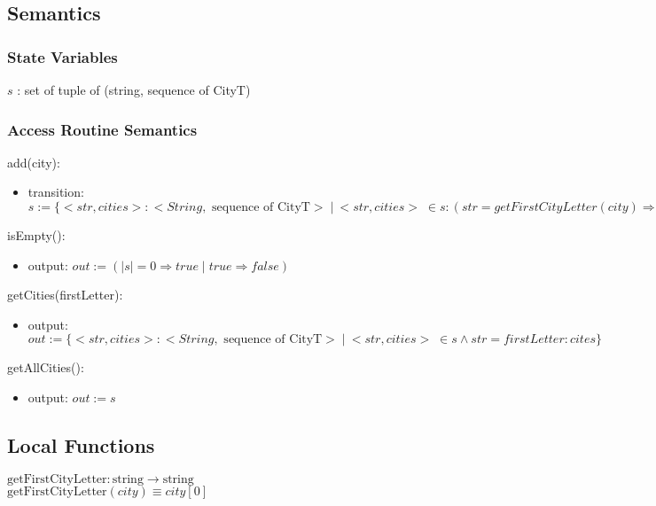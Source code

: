 \documentclass[12pt]{article}
\begin{document}
\subsection* {Semantics}

\subsubsection* {State Variables}

$\mathit{s}$ : set of tuple of (string, sequence of CityT) \\

\subsubsection* {Access Routine Semantics}

\noindent add(city):
\begin{itemize}
\item transition: $s := \{<str,cities> : <String, \mbox{ sequence of CityT} > \;|\: <str, cities> \;\in s: (str = getFirstCityLetter(city) \Rightarrow <str, cities || [city]> \;|\: true \Rightarrow <str, cities> )\}$ 
\end{itemize}

\noindent isEmpty():
\begin{itemize}
\item output: $\mathit{out} := (|s| = 0 \Rightarrow true \;|\; true \Rightarrow false)$
\end{itemize}


\noindent getCities(firstLetter):
\begin{itemize}
\item output: $\mathit{out} := \{<str,cities> : <String, \mbox{ sequence of CityT} > \;|\: <str, cities> \;\in s \land str = firstLetter :cites \}$ 
\end{itemize}

\noindent getAllCities():
\begin{itemize}
\item output: $\mathit{out} := s$ 
\end{itemize}

\subsection*{Local Functions}

\noindent $\text{getFirstCityLetter}: \text{string} \rightarrow \text{string}$\\
\noindent $\text{getFirstCityLetter}(city) \equiv city[0]$\\
\end{document}
